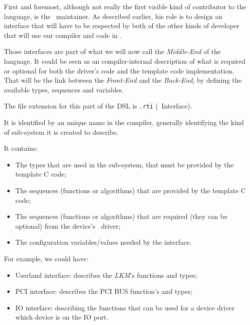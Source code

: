 \documentclass[american]{rtxreport}
\begin{document}
First and foremost, although not really the first visible kind of contributor
to the language, is the \rtx\ maintainer. As described earlier, his role is
to design an interface that will have to be respected by both of the other kinds
of developer that will use our compiler and code in \rtx.

Those interfaces are part of what we will now call the \emph{Middle-End} of the
language. It could be seen as an compiler-internal description of what is
required or optional for both the driver's code and the template code
implementation. That will be the link between the \emph{Front-End} and the
\emph{Back-End}, by defining the available types, sequences and variables.

The file extension for this part of the DSL is \texttt{.rti} (\rtx\ Interface).

It is identified by an unique name in the compiler, generally identifying the
kind of sub-system it is created to describe.

It contains:
\begin{itemize}
    \item The types that are used in the sub-system, that must be provided by
        the template C code;
    \item The sequences (functions or algorithms) that are provided by the
        template C code;
    \item The sequences (functions or algorithms) that are required
        (they can be optional) from the device's \rtx\ driver;
    \item The configuration variables/values needed by the interface.
\end{itemize}

For example, we could have:
\begin{itemize}
    \item Userland interface: describes the \emph{LKM}'s functions and types;
    \item PCI interface: describes the PCI BUS function's and types;
    \item IO interface: describing the functions that can be used
for a device driver which device is on the IO port.
\end{itemize}
\end{document}

